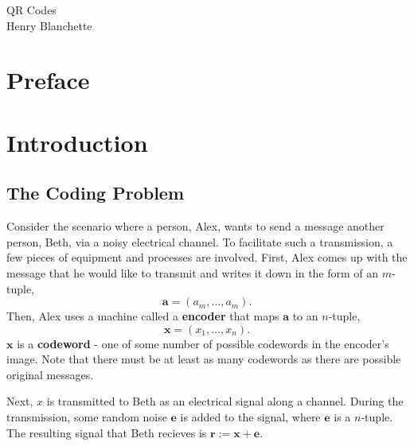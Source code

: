 \documentclass{article}
\renewcommand{\=}{\equiv}
\renewcommand{\v}{\mathbf}
\newcommand{\x}{{\v x}}
\theoremstyle{plain}
\theoremstyle{definition}
\begin{document}
\begin{center}
  {\huge\sc QR Codes}
  \\[2em]
  {\large Henry Blanchette}
\end{center}

\vspace{4em}

\newpage
\tableofcontents

\newpage

\setcounter{section}{-1}
\section{Preface}

\section{Introduction}

\subsection{The Coding Problem}
Consider the scenario where a person, Alex, wants to send a message another person, Beth, via a noisy electrical channel.
To facilitate such a transmission, a few pieces of equipment and processes are involved.
First, Alex comes up with the message that he would like to transmit and writes it down in the form of an $m$-tuple,
$$ \v a = (a_m, \dots, a_m). $$
Then, Alex uses a machine called a \textbf{encoder} that maps $\v a$ to an $n$-tuple,
$$ \x = (x_1, \dots, x_n). $$
$\x$ is a \textbf{codeword} - one of some number of possible codewords in the encoder's image.
Note that there must be at least as many codewords as there are possible original messages.

Next, $x$ is transmitted to Beth as an electrical signal along a channel.
During the transmission, some random noise $\v e$ is added to the signal, where $\v e$ is a $n$-tuple.
The resulting signal that Beth recieves is $\v r := \x + \v e$.
\end{document}
